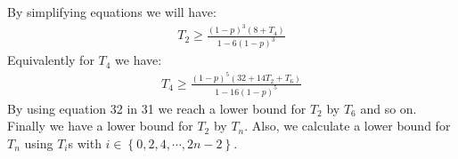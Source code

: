 \documentclass[]{book}
\theoremstyle{definition}
\begin{document}
By simplifying equations we will have:
\begin{equation}
\begin{split}
    T_2 \ge \frac{\left( 1-p \right)^3\left( 8+T_4 \right)}{1-6\left( 1-p \right)^3}
\end{split}
\end{equation}
Equivalently for $T_4$ we have:
\begin{equation}
\begin{split}
    T_4 \ge \frac{\left( 1-p \right)^5\left( 32+14T_2+T_6 \right)}{1-16\left( 1-p \right)^5}
\end{split}
\end{equation}
By using equation 32 in 31 we reach a lower bound for $T_2$ by $T_6$ and so on. Finally we have a lower bound for $T_2$ by $T_n$. Also, we calculate a lower bound for $T_n$ using $T_i$s with $i \in \left\{ 0, 2, 4, \cdots, 2n-2 \right\}$.
\end{document}
